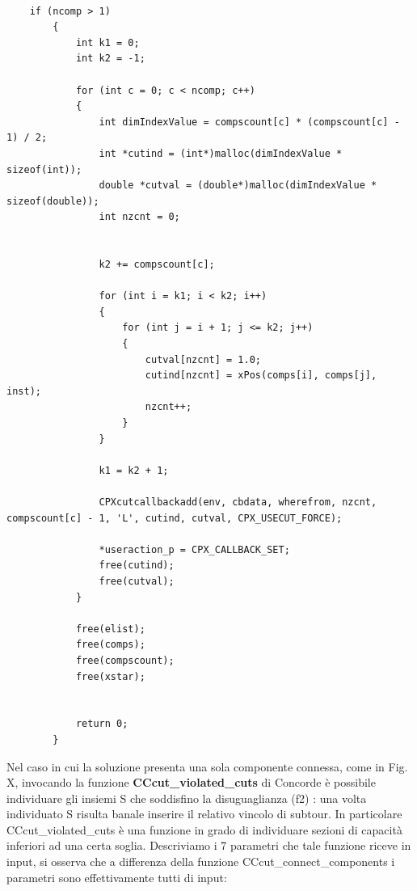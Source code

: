 \documentclass[11pt]{article}
\begin{document}
\begin{lstlisting}

	if (ncomp > 1)
		{
			int k1 = 0;
			int k2 = -1;

			for (int c = 0; c < ncomp; c++)
			{
				int dimIndexValue = compscount[c] * (compscount[c] - 1) / 2; 
				int *cutind = (int*)malloc(dimIndexValue * sizeof(int));
				double *cutval = (double*)malloc(dimIndexValue * sizeof(double));
				int nzcnt = 0;

				
				k2 += compscount[c];

				for (int i = k1; i < k2; i++)
				{
					for (int j = i + 1; j <= k2; j++)
					{
						cutval[nzcnt] = 1.0;
						cutind[nzcnt] = xPos(comps[i], comps[j], inst);
						nzcnt++;
					}
				}

				k1 = k2 + 1;	
				
				CPXcutcallbackadd(env, cbdata, wherefrom, nzcnt, compscount[c] - 1, 'L', cutind, cutval, CPX_USECUT_FORCE);

				*useraction_p = CPX_CALLBACK_SET; 
				free(cutind);
				free(cutval);
			}

			free(elist);
			free(comps);
			free(compscount);
			free(xstar);


			return 0;
		}

\end{lstlisting}


Nel caso in cui la soluzione presenta una sola componente connessa, come in Fig. X, invocando la funzione \textbf{CCcut_violated_cuts} di Concorde è possibile individuare gli insiemi S che soddisfino la disuguaglianza (f2) : una volta individuato S risulta banale inserire il relativo vincolo di subtour. In particolare CCcut_violated_cuts è una funzione in grado di individuare sezioni di capacità inferiori ad una certa soglia. Descriviamo i 7 parametri che tale funzione riceve in input, si osserva che a differenza della funzione CCcut_connect_components i parametri sono effettivamente tutti di input:
\end{document}
